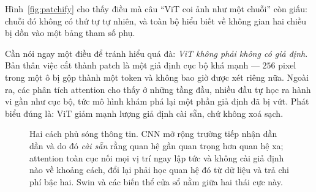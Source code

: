 \documentclass[../../../deep_learning.tex]{subfiles}
\begin{document}
Hình~\ref{fig:patchify} cho thấy điều mà câu ``ViT coi ảnh như một chuỗi'' còn giấu: chuỗi đó không có thứ tự tự nhiên, và toàn bộ hiểu biết về không gian hai chiều bị dồn vào một bảng tham số phụ.

Cần nói ngay một điều để tránh hiểu quá đà: \emph{ViT không phải không có giả định}. Bản thân việc cắt thành patch là một giả định cục bộ khá mạnh --- \(256\) pixel trong một ô bị gộp thành một token và không bao giờ được xét riêng nữa. Ngoài ra, các phân tích attention cho thấy ở những tầng đầu, nhiều đầu tự học ra hành vi gần như cục bộ, tức mô hình khám phá lại một phần giả định đã bị vứt. Phát biểu đúng là: ViT giảm mạnh lượng giả định cài sẵn, chứ không xoá sạch.

\begin{figure}[H]\centering
{}
\caption{Hai cách phủ sóng thông tin. CNN mở rộng trường tiếp nhận dần dần và do đó \emph{cài sẵn} rằng quan hệ gần quan trọng hơn quan hệ xa; attention toàn cục nối mọi vị trí ngay lập tức và không cài giả định nào về khoảng cách, đổi lại phải học quan hệ đó từ dữ liệu và trả chi phí bậc hai. Swin và các biến thể cửa sổ nằm giữa hai thái cực này.}
\label{fig:rf-cnn-vs-attn}
\end{figure}
\end{document}
